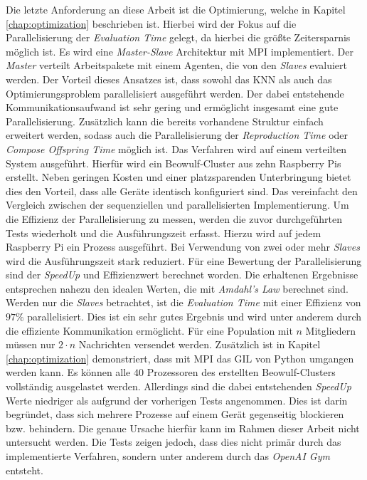 Die letzte Anforderung an diese Arbeit ist die Optimierung, welche in Kapitel \ref{chap:optimization} beschrieben ist. Hierbei wird der Fokus auf die Parallelisierung der \emph{Evaluation Time} gelegt, da hierbei die größte Zeitersparnis möglich ist. Es wird eine \emph{Master-Slave} Architektur mit \ac{MPI} implementiert. Der \emph{Master} verteilt Arbeitspakete mit einem Agenten, die von den \emph{Slaves} evaluiert werden. Der Vorteil dieses Ansatzes ist, dass sowohl das \ac{KNN} als auch das Optimierungsproblem parallelisiert ausgeführt werden. Der dabei entstehende Kommunikationsaufwand ist sehr gering und ermöglicht insgesamt eine gute Parallelisierung. Zusätzlich kann die bereits vorhandene Struktur einfach erweitert werden, sodass auch die Parallelisierung der \emph{Reproduction Time} oder \emph{Compose Offspring Time} möglich ist. Das Verfahren wird auf einem verteilten System ausgeführt. Hierfür wird ein Beowulf-Cluster aus zehn Raspberry Pis erstellt. Neben geringen Kosten und einer platzsparenden Unterbringung bietet dies den Vorteil, dass alle Geräte identisch konfiguriert sind. Das vereinfacht den Vergleich zwischen der sequenziellen und parallelisierten Implementierung. Um die Effizienz der Parallelisierung zu messen, werden die zuvor durchgeführten Tests wiederholt und die Ausführungszeit erfasst. Hierzu wird auf jedem Raspberry Pi ein Prozess ausgeführt. Bei Verwendung von zwei oder mehr \emph{Slaves} wird die Ausführungszeit stark reduziert. Für eine Bewertung der Parallelisierung sind der \emph{SpeedUp} und Effizienzwert berechnet worden. Die erhaltenen Ergebnisse entsprechen nahezu den idealen Werten, die mit \emph{Amdahl's Law} berechnet sind. Werden nur die \emph{Slaves} betrachtet, ist die \emph{Evaluation Time} mit einer Effizienz von $97\%$ parallelisiert. Dies ist ein sehr gutes Ergebnis und wird unter anderem durch die effiziente Kommunikation ermöglicht. Für eine Population mit $n$ Mitgliedern müssen nur $2 \cdot n$ Nachrichten versendet werden. Zusätzlich ist in Kapitel \ref{chap:optimization} demonstriert, dass mit \ac{MPI} das \ac{GIL} von Python umgangen werden kann. Es können alle $40$ Prozessoren des erstellten Beowulf-Clusters vollständig ausgelastet werden. Allerdings sind die dabei entstehenden \emph{SpeedUp} Werte niedriger als aufgrund der vorherigen Tests angenommen. Dies ist darin begründet, dass sich mehrere Prozesse auf einem Gerät gegenseitig blockieren bzw. behindern. Die genaue Ursache hierfür kann im Rahmen dieser Arbeit nicht untersucht werden. Die Tests zeigen jedoch, dass dies nicht primär durch das implementierte Verfahren, sondern unter anderem durch das \emph{OpenAI Gym} entsteht.
